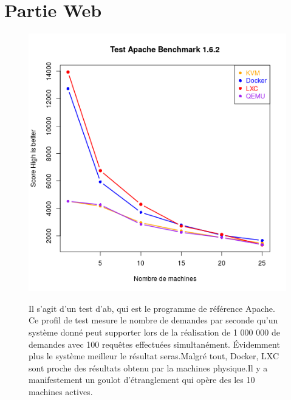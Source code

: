 \section{Partie Web}
\begin{figure}[h]
   \begin{minipage}[c]{.46\linewidth}
	   \includegraphics[scale=0.5]{resultats/apache.png}
   \end{minipage} \hfill
   \begin{minipage}[c]{.46\linewidth}
      	Il s'agit d'un test d'ab, qui est le programme de référence Apache. Ce profil de test mesure le nombre de demandes par seconde qu'un système donné peut supporter lors de la réalisation de 1 000 000 de demandes avec 100 requêtes effectuées simultanément. Évidemment plus le système meilleur le résultat seras.Malgré tout, Docker, LXC sont proche des résultats obtenu par la machines physique.Il y a manifestement un goulot d’étranglement qui opère des les 10 machines actives.
   \end{minipage}
\end{figure}

